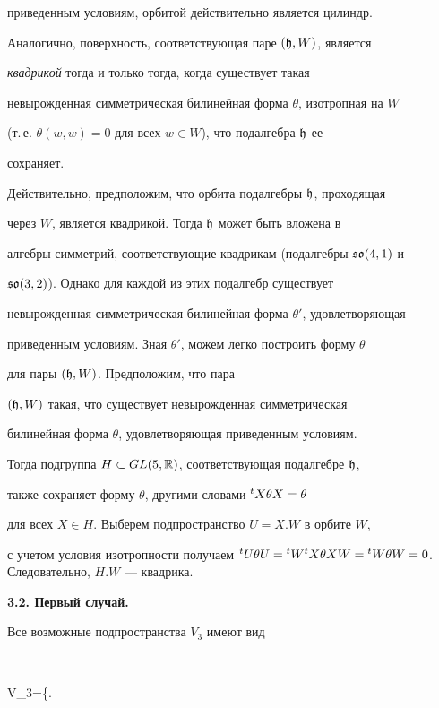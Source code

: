 приведенным условиям, орбитой действительно является цилиндр. 





Аналогично, поверхность, соответствующая паре $(\frak h,W)$, является


{\it квадрикой} тогда и только тогда, когда существует такая


невырожденная симметрическая билинейная форма $\theta$, изотропная на $W$


(т.\,е. $\theta(w,w)=0$ для всех $w\in W$), что подалгебра $\frak h$ ее


сохраняет.





Действительно, предположим, что орбита подалгебры $\frak h$, проходящая


через $W$, является квадрикой. Тогда $\frak h$ может быть вложена в


алгебры симметрий, соответствующие квадрикам (подалгебры $\frak{so}(4,1)$ и 


$\frak{so}(3,2)$). Однако для каждой из этих подалгебр существует


невырожденная симметрическая билинейная форма $\theta'$, удовлетворяющая


приведенным условиям. Зная $\theta'$, можем легко построить форму $\theta$


для пары $(\frak h,W)$. Предположим, что пара


 $(\frak h,W)$ такая, что существует невырожденная симметрическая


билинейная форма $\theta$, удовлетворяющая приведенным условиям. 


Тогда подгруппа $H\subset GL(5,\Bbb R)$, соответствующая подалгебре $\frak h$,


также сохраняет форму $\theta$, другими словами ${}^tX\theta X=\theta$


для всех $X\in H$. Выберем подпространство $U=X.W$ в орбите $W$,


с учетом условия изотропности получаем $\T U\theta U=


\T W\T X \theta X W= \T W\theta W=0$. Следовательно, $H.W$ --- квадрика.


\medskip





{\bf 3.2. Первый случай.}


Все возможные подпространства $V_3$ имеют вид


$$


V_3=\left\{\left.


